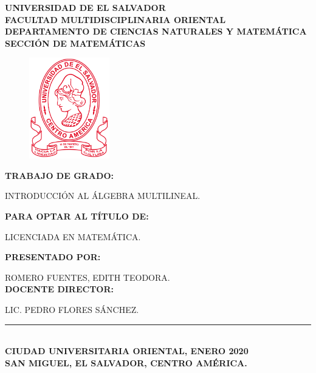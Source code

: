 
	\thispagestyle{empty}%
\begin{center}
	\begin{normalsize}
		\textbf{UNIVERSIDAD DE EL SALVADOR\\
			FACULTAD MULTIDISCIPLINARIA ORIENTAL\\
			DEPARTAMENTO DE CIENCIAS NATURALES Y MATEMÁTICA\\  SECCIÓN DE MATEMÁTICAS\\ }
	\end{normalsize}
	\begin{figure}[htb]
		\begin{center}
			\vspace*{0.2in}
			\includegraphics[width=3.5cm]{figuras/logo}
			\vspace*{-0.1in}
		\end{center}
	\end{figure}
	\begin{large}
		\textbf{TRABAJO DE GRADO:}
		
		INTRODUCCIÓN AL ÁLGEBRA MULTILINEAL.
		
		\vspace*{0.2in}
		
		\textbf{PARA OPTAR AL TÍTULO DE:}
		
		LICENCIADA EN MATEMÁTICA.
		\vspace*{0.2in}
		
		\textbf{PRESENTADO POR: }
		
		ROMERO FUENTES, EDITH TEODORA.\\
		
		
		\vspace*{0.2in}
		\textbf{DOCENTE DIRECTOR:}%
		
		LIC. PEDRO FLORES SÁNCHEZ.
		
	\end{large}
	\vspace*{1.5in}
	\rule{150mm}{0.9mm}\\ %
	\vspace*{0.1in}
	\textbf{CIUDAD UNIVERSITARIA ORIENTAL, ENERO 2020 \\
		SAN MIGUEL, EL SALVADOR, CENTRO AMÉRICA.} 
\end{center}

